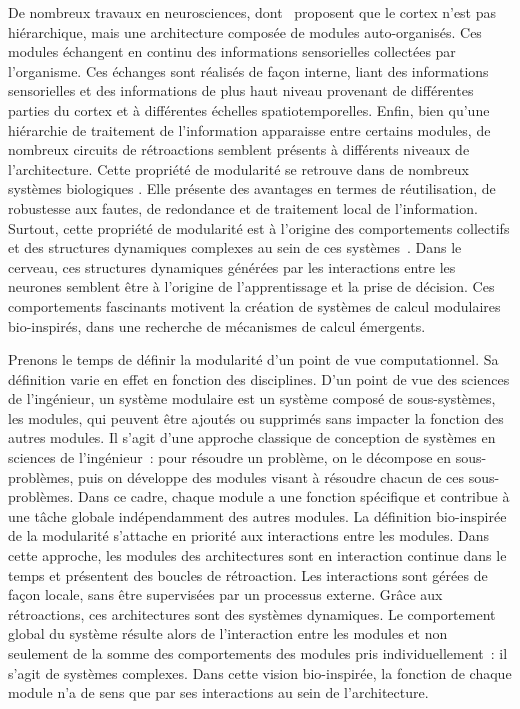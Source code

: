 De nombreux travaux en neurosciences, dont~\cite{binzegger05, Meunier2009HierarchicalMI,sporns_structure_2013,betzel_multi-scale_2017} proposent que le cortex n'est pas hiérarchique, mais une architecture composée de modules auto-organisés.
Ces modules échangent en continu des informations sensorielles collectées par l'organisme. Ces échanges sont réalisés de façon interne, liant des informations sensorielles et des informations de plus haut niveau provenant de différentes parties du cortex et à différentes échelles spatiotemporelles. 
Enfin, bien qu'une hiérarchie de traitement de l'information apparaisse entre certains modules, de nombreux circuits de rétroactions semblent présents à différents niveaux de l'architecture.
Cette propriété de modularité se retrouve dans de nombreux systèmes biologiques \parencite{clune_evolutionary_2013}. Elle présente des avantages en termes de réutilisation, de robustesse aux fautes, de redondance et de traitement local de l'information. Surtout, cette propriété de modularité est à l'origine des comportements collectifs et des structures dynamiques complexes au sein de ces systèmes~\parencite{flake_computational,Siebert2020RoleOM}.
Dans le cerveau, ces structures dynamiques générées par les interactions entre les neurones semblent être à l'origine de l'apprentissage et la prise de décision. 
Ces comportements fascinants motivent la création de systèmes de calcul modulaires bio-inspirés, dans une recherche de mécanismes de calcul émergents.

Prenons le temps de définir la modularité d'un point de vue computationnel. 
Sa définition varie en effet en fonction des disciplines. D'un point de vue des sciences de l'ingénieur, un système modulaire est un système composé de sous-systèmes, les modules, qui peuvent être ajoutés ou supprimés sans impacter la fonction des autres modules.
Il s'agit d'une approche classique de conception de systèmes en sciences de l'ingénieur~: pour résoudre un problème, on le décompose en sous-problèmes, puis on développe des modules visant à résoudre chacun de ces sous-problèmes.
Dans ce cadre, chaque module a une fonction spécifique et contribue à une tâche globale indépendamment des autres modules.
La définition bio-inspirée de la modularité s'attache en priorité aux interactions entre les modules.
Dans cette approche, les modules des architectures sont en interaction continue dans le temps et présentent des boucles de rétroaction. Les interactions sont gérées de façon locale, sans être supervisées par un processus externe. Grâce aux rétroactions, ces architectures sont des systèmes dynamiques.
Le comportement global du système résulte alors de l'interaction entre les modules et non seulement de la somme des comportements des modules pris individuellement~: il s'agit de systèmes complexes.
Dans cette vision bio-inspirée, la fonction de chaque module n'a de sens que par ses interactions au sein de l'architecture.

